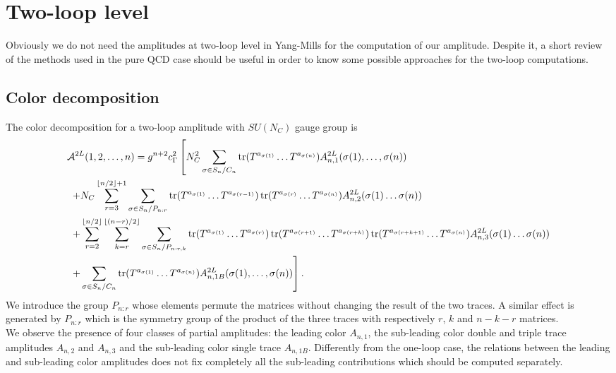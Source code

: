\section{Two-loop level}
Obviously we do not need the amplitudes at two-loop level in Yang-Mills for the computation of our amplitude. Despite it, a short review of the methods used in the pure QCD case should be useful in order to know some possible approaches for the two-loop computations.
\subsection{Color decomposition}
The color decomposition for a two-loop amplitude with $SU(N_C)$ gauge group is \cite{PhysRevD.101.016009,Dalgleish_2020}
\begin{align*}
	&\mathcal{A}^{2L}(1,2,\dots,n)=g^{n+2} c_\Gamma^2 \left[N_C^2 \sum_{\sigma \in S_n/C_n} \tr(T^{a_{\sigma(1)}}\dots T^{a_{\sigma(n)}})A^{2L}_{n,1}(\sigma(1),\dots,\sigma(n)) \right. \\
	&\hspace{0.1cm}\left. + N_C \sum_{r=3}^{\lfloor n/2 \rfloor +1} \sum_{\sigma \in S_n/P_{n:r}} \tr(T^{a_{\sigma(1)}}\dots T^{a_{\sigma(r-1)}})\tr(T^{a_{\sigma(r)}}\dots T^{a_{\sigma(n)}}) A^{2L}_{n,2}(\sigma(1)\dots \sigma(n))\right.\\
	&\hspace{0.1cm}\left. +\sum_{r=2}^{\lfloor n/2 \rfloor} \sum_{k=r}^{\lfloor (n-r)/2\rfloor} \sum_{\sigma \in S_n/P_{n:r,k}} \tr(T^{a_{\sigma(1)}}\dots T^{a_{\sigma(r)}}) \tr(T^{a_{\sigma(r+1)}}\dots T^{a_{\sigma(r+k)}}) \tr(T^{a_{\sigma(r+k+1)}}\dots T^{a_{\sigma(n)}}) A^{2L}_{n,3}(\sigma(1)\dots \sigma(n)) \right.\\
		&\hspace{0.1cm}\left.  +  \sum_{\sigma \in S_n/C_n} \tr(T^{a_{\sigma(1)}}\dots T^{a_{\sigma(n)}})A^{2L}_{n,1B}(\sigma(1),\dots,\sigma(n))  \right].
\end{align*}
We introduce the group $P_{n:r}$ whose elements permute the matrices without changing the result of the two traces. A similar effect is generated by $P_{n:r}$ which is the symmetry group of the product of the three traces with respectively $r$, $k$ and $n-k-r$ matrices.\\
We observe the presence of four classes of partial amplitudes: the leading color $A_{n,1}$, the sub-leading color double and triple trace amplitudes $A_{n,2}$ and $A_{n,3}$ and the sub-leading color single trace $A_{n,1B}$. Differently from the one-loop case, the relations between the leading and sub-leading color amplitudes does not fix completely all the sub-leading contributions which should be computed separately.\\

